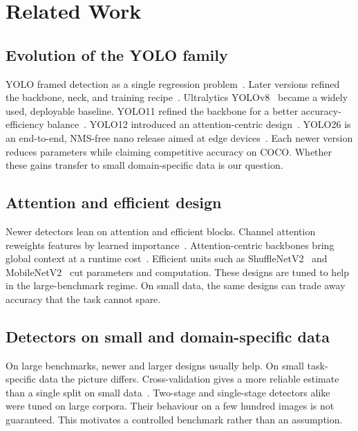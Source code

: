 \documentclass[conference]{IEEEtran}
\begin{document}
\section{Related Work}

\subsection{Evolution of the YOLO family}
YOLO framed detection as a single regression problem~\cite{redmon2016you}.
Later versions refined the backbone, neck, and training
recipe~\cite{redmon2018yolov3, bochkovskiy2020yolov4}. Ultralytics
YOLOv8~\cite{jocher2023yolov8} became a widely used, deployable baseline.
YOLO11 refined the backbone for a better accuracy-efficiency
balance~\cite{jocher2024yolo11}. YOLO12 introduced an attention-centric
design~\cite{tian2025yolov12}. YOLO26 is an end-to-end, NMS-free nano release
aimed at edge devices~\cite{ultralytics2025yolo26}. Each newer version reduces
parameters while claiming competitive accuracy on COCO. Whether these gains
transfer to small domain-specific data is our question.

\subsection{Attention and efficient design}
Newer detectors lean on attention and efficient blocks. Channel attention
reweights features by learned importance~\cite{hu2018squeeze, wang2020eca}.
Attention-centric backbones bring global context at a runtime
cost~\cite{tian2025yolov12}. Efficient units such as
ShuffleNetV2~\cite{ma2018shufflenet} and MobileNetV2~\cite{sandler2018mobilenetv2}
cut parameters and computation. These designs are tuned to help in the
large-benchmark regime. On small data, the same designs can trade away accuracy
that the task cannot spare.

\subsection{Detectors on small and domain-specific data}
On large benchmarks, newer and larger designs usually help. On small
task-specific data the picture differs. Cross-validation gives a more reliable
estimate than a single split on small data~\cite{kohavi1995study}. Two-stage
and single-stage detectors alike~\cite{ren2015faster, liu2016ssd, lin2017focal,
tan2020efficientdet} were tuned on large corpora. Their behaviour on a few
hundred images is not guaranteed. This motivates a controlled benchmark rather
than an assumption.
\end{document}
